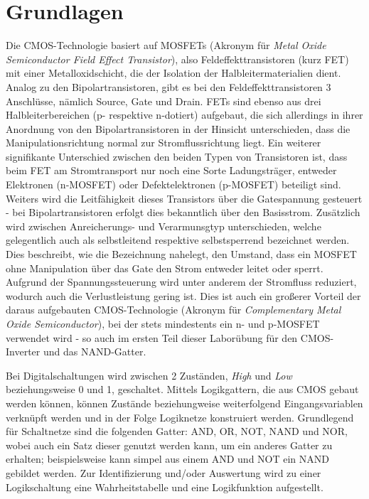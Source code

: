 \documentclass[12pt,english,ngerman]{scrartcl}
\begin{document}
\section{Grundlagen}\label{sec:Grundlagen}
%
Die CMOS-Technologie basiert auf MOSFETs (Akronym für \textit{Metal Oxide
Semiconductor Field Effect Transistor}), also Feldeffekttransistoren (kurz FET)
mit einer Metalloxidschicht, die der Isolation der Halbleitermaterialien dient.
Analog zu den Bipolartransistoren, gibt es bei den Feldeffekttransistoren 3
Anschlüsse, nämlich Source, Gate und Drain. 
FETs sind ebenso aus drei Halbleiterbereichen (p- respektive n-dotiert)
aufgebaut, die sich allerdings in ihrer Anordnung von den Bipolartransistoren
in der Hinsicht unterschieden, dass die Manipulationsrichtung normal zur
Stromflussrichtung liegt. Ein weiterer signifikante Unterschied zwischen den beiden
Typen von Transistoren ist, dass beim FET am Stromtransport nur noch eine Sorte
Ladungsträger, entweder Elektronen (n-MOSFET) oder Defektelektronen (p-MOSFET)
beteiligt sind. Weiters wird die Leitfähigkeit dieses Transistors über die
Gatespannung gesteuert - bei Bipolartransistoren erfolgt dies bekanntlich über
den Basisstrom. Zusätzlich wird zwischen Anreicherungs- und Verarmunsgtyp
unterschieden, welche gelegentlich auch als selbstleitend respektive
selbstsperrend bezeichnet werden. Dies beschreibt, wie die Bezeichnung
nahelegt, den Umstand, dass ein MOSFET ohne Manipulation über das Gate den
Strom entweder leitet oder sperrt. Aufgrund der Spannungssteuerung wird unter
anderem der Stromfluss reduziert, wodurch auch die Verlustleistung gering ist.
Dies ist auch ein großerer Vorteil der daraus aufgebauten CMOS-Technologie
(Akronym für \textit{Complementary Metal Oxide Semiconductor}), bei der stets
mindestents ein n- und p-MOSFET verwendet wird - so auch im ersten Teil dieser
Laborübung für den CMOS-Inverter und das NAND-Gatter. 

Bei Digitalschaltungen wird zwischen 2 Zuständen, \textit{High} und
\textit{Low} beziehungsweise 0 und 1, geschaltet. Mittels Logikgattern, die aus CMOS gebaut werden
können, können
Zustände beziehungweise weiterfolgend Eingangsvariablen verknüpft werden und in
der Folge Logiknetze konstruiert werden. Grundlegend für Schaltnetze sind die folgenden Gatter: AND, OR,
NOT, NAND und NOR, wobei auch ein Satz dieser genutzt werden kann, um ein anderes Gatter
zu erhalten; beispielsweise kann simpel aus einem AND und NOT ein NAND gebildet werden. Zur
Identifizierung und/oder Auswertung wird zu einer Logikschaltung eine
Wahrheitstabelle und eine Logikfunktion aufgestellt.
\end{document}
